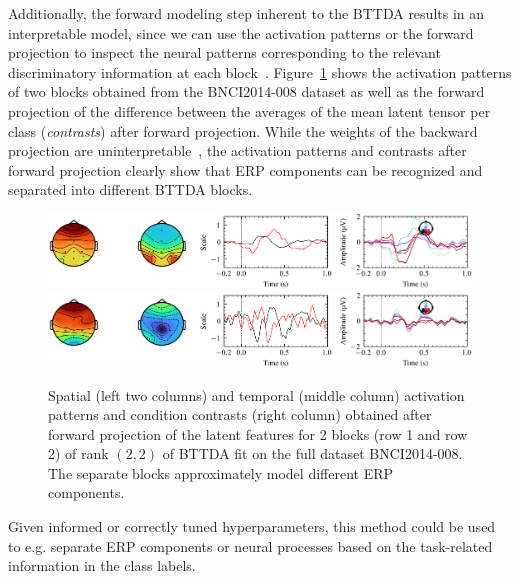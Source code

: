 Additionally, the forward modeling step inherent to the BTTDA results
in an interpretable model, since we can use the activation patterns or the
forward projection to inspect the neural patterns corresponding to the
relevant discriminatory information at each block~\cite{Haufe2014}.
Figure~\ref{fig:forward} shows the activation patterns
of two blocks obtained from the BNCI2014-008 dataset as well as the forward
projection of the difference between the averages of the mean latent tensor per
class (\emph{contrasts}) after forward projection.
While the weights of the backward projection are
uninterpretable~\cite{Haufe2014},
the activation patterns and contrasts after forward projection clearly show
that ERP components can be recognized and separated into different
BTTDA blocks.
\begin{figure}[t]
	\includegraphics[width=\linewidth]{figures/bttda/forward_block-0.png}
	\includegraphics[width=\linewidth]{figures/bttda/forward_block-1.png}
  \caption[Extracted \ac{bttda} activation patterns.]{%
    Spatial (left two columns) and temporal (middle column) activation patterns and
		condition contrasts (right column) obtained after forward projection of the latent
		features for 2 blocks (row 1 and row 2) of rank $(2,2)$ of BTTDA
		fit on the full dataset BNCI2014-008.
		The separate blocks approximately model different ERP
		components.}
	\label{fig:forward}
\end{figure}
Given informed or correctly tuned hyperparameters, this method could be used to
e.g. separate ERP components or neural processes based on the task-related
information in the class labels.


